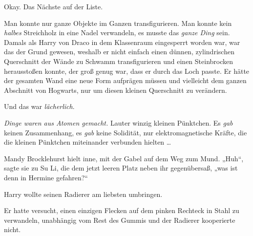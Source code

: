 Okay. Das Nächste auf der Liste.

Man konnte nur ganze Objekte im Ganzen transfigurieren. Man konnte kein \emph{halbes} Streichholz in eine Nadel verwandeln, es musste das \emph{ganze Ding} sein. Damals als Harry von Draco in dem Klassenraum eingesperrt worden war, war das der Grund gewesen, weshalb er nicht einfach einen dünnen, zylindrischen Querschnitt der Wände zu Schwamm transfigurieren und einen Steinbrocken herausstoßen konnte, der groß genug war, dass er durch das Loch passte. Er hätte der gesamten Wand eine neue Form aufprägen müssen und vielleicht dem ganzen Abschnitt von Hogwarts, nur um diesen kleinen Querschnitt zu verändern.

Und das war \emph{lächerlich}.

\emph{Dinge waren aus Atomen gemacht.} Lauter winzig kleinen Pünktchen. Es \emph{gab} keinen Zusammenhang, es \emph{gab} keine Solidität, nur elektromagnetische Kräfte, die die kleinen Pünktchen miteinander verbunden hielten …

\later

Mandy Brocklehurst hielt inne, mit der Gabel auf dem Weg zum Mund.
„Huh“, sagte sie zu Su Li, die dem jetzt leeren Platz neben ihr gegenübersaß, „was ist denn in Hermine gefahren?“

\later

Harry wollte seinen Radierer am liebsten umbringen.

Er hatte versucht, einen einzigen Flecken auf dem pinken Rechteck in Stahl zu verwandeln, unabhängig vom Rest des Gummis und der Radierer kooperierte nicht.

